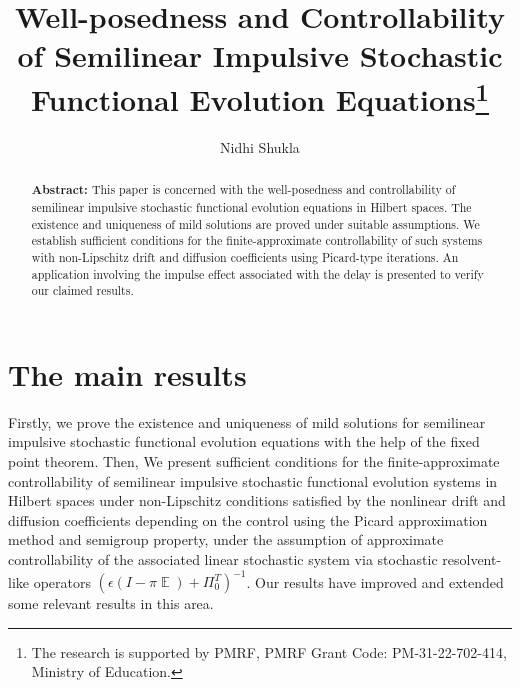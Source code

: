 \documentclass[12pt]{llncs}
\begin{document}
\fi
%
\title{Well-posedness and Controllability of Semilinear Impulsive Stochastic Functional Evolution Equations\thanks{The research is supported by PMRF, PMRF Grant Code: PM-31-22-702-414, Ministry of Education.}}
\author{Nidhi Shukla}
 

\maketitle

\begin{abstract}
\textbf{Abstract:} This paper is concerned with the well-posedness and controllability of semilinear impulsive stochastic functional evolution equations in Hilbert spaces. The existence and uniqueness of mild solutions are proved under suitable assumptions. We establish sufficient conditions for the finite-approximate controllability of such systems with non-Lipschitz drift and diffusion coefficients using Picard-type iterations. An application involving the impulse effect associated with the delay is presented to verify our claimed results.

\end{abstract}

\section{The main results}
Firstly, we prove the existence and uniqueness of mild solutions for semilinear impulsive stochastic functional evolution equations with the help of the fixed point theorem. Then, We present sufficient conditions for the finite-approximate controllability of semilinear impulsive stochastic functional evolution systems in Hilbert spaces under non-Lipschitz conditions satisfied by the nonlinear drift and diffusion coefficients depending on the control using the Picard approximation method and semigroup property, under the assumption of approximate controllability of the associated linear stochastic system via stochastic resolvent-like operators 
$(\epsilon(I-\pi \mathop{\mathbb{E}(\cdot)})+\Pi^T_{0})^{-1}$. Our results have improved and extended some relevant results in this area.
\end{document}
